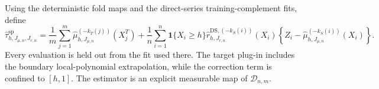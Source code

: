 Using the deterministic fold maps and the direct-series training-complement fits, define
\[
\widehat\tau^{\mathrm{sp}}_{h,J_{\mu,n},J_{r,n}}
=\frac1m\sum_{j=1}^m\widehat\mu^{(-k_T(j))}_{h,J_{\mu,n}}(X_j^T)
+\frac1n\sum_{i=1}^n\mathbf 1\{X_i\ge h\}\widehat r^{\mathrm{DS},(-k_S(i))}_{h,J_{r,n}}(X_i)
\left\{Z_i-\widehat\mu^{(-k_S(i))}_{h,J_{\mu,n}}(X_i)\right\}.
\]
Every evaluation is held out from the fit used there.  The target plug-in includes the boundary local-polynomial extrapolation, while the correction term is confined to \([h,1]\).  The estimator is an explicit measurable map of \(\mathcal D_{n,m}\).